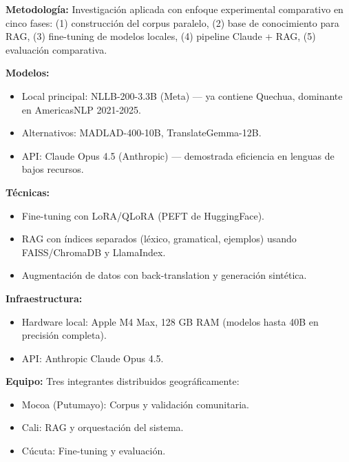 \documentclass[11pt,a4paper]{article}
\begin{document}
\begin{campo}
\textbf{Metodología:} Investigación aplicada con enfoque experimental comparativo en cinco fases: (1) construcción del corpus paralelo, (2) base de conocimiento para RAG, (3) fine-tuning de modelos locales, (4) pipeline Claude + RAG, (5) evaluación comparativa.

\textbf{Modelos:}
\begin{itemize}[nosep,leftmargin=*]
    \item Local principal: NLLB-200-3.3B (Meta) --- ya contiene Quechua, dominante en AmericasNLP 2021-2025.
    \item Alternativos: MADLAD-400-10B, TranslateGemma-12B.
    \item API: Claude Opus 4.5 (Anthropic) --- demostrada eficiencia en lenguas de bajos recursos.
\end{itemize}

\textbf{Técnicas:}
\begin{itemize}[nosep,leftmargin=*]
    \item Fine-tuning con LoRA/QLoRA (PEFT de HuggingFace).
    \item RAG con índices separados (léxico, gramatical, ejemplos) usando FAISS/ChromaDB y LlamaIndex.
    \item Augmentación de datos con back-translation y generación sintética.
\end{itemize}

\textbf{Infraestructura:}
\begin{itemize}[nosep,leftmargin=*]
    \item Hardware local: Apple M4 Max, 128 GB RAM (modelos hasta 40B en precisión completa).
    \item API: Anthropic Claude Opus 4.5.
\end{itemize}

\textbf{Equipo:} Tres integrantes distribuidos geográficamente:
\begin{itemize}[nosep,leftmargin=*]
    \item Mocoa (Putumayo): Corpus y validación comunitaria.
    \item Cali: RAG y orquestación del sistema.
    \item Cúcuta: Fine-tuning y evaluación.
\end{itemize}
\end{campo}
\end{document}
